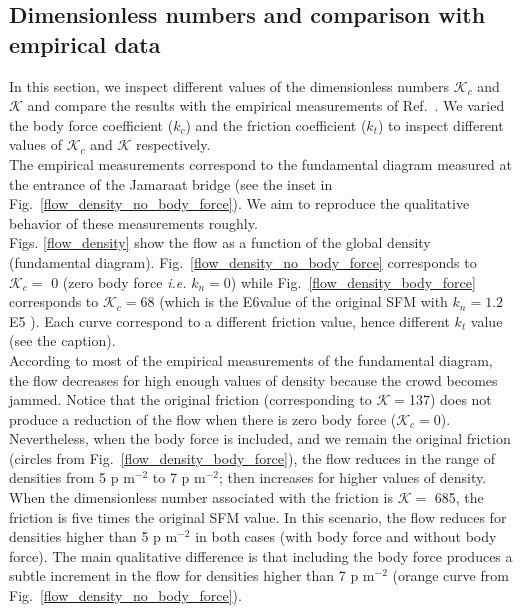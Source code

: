 \documentclass[preprint,12pt]{elsarticle}
\begin{document}
\subsection{Dimensionless numbers and comparison with empirical data}


In this section, we inspect different values of the dimensionless numbers $\mathcal{K}_c$ and $\mathcal{K}$ and compare the results with the empirical measurements of Ref.~\cite{helbing_2007}. We varied the body force coefficient ($k_c$) and the friction coefficient ($k_t$) to inspect different values of $\mathcal{K}_c$ and $\mathcal{K}$ respectively.\\

The empirical measurements correspond to the fundamental diagram measured at the entrance of the Jamaraat bridge (see the inset in Fig.~\ref{flow_density_no_body_force}). We aim to reproduce the qualitative behavior of these measurements roughly.\\

Figs. \ref{flow_density} show the flow as a function of the global density (fundamental diagram). Fig.~\ref{flow_density_no_body_force} corresponds to $\mathcal{K}_c=$ 0 (zero body force \textit{i.e.} $k_n=0$) while Fig.~\ref{flow_density_body_force} corresponds to $\mathcal{K}_c=$68 (which is the E6value of the original SFM with $k_n=1.2\,$E5 ). Each curve correspond to a different friction value, hence different $k_t$ value (see the caption).\\

According to most of the empirical measurements of the fundamental diagram, the flow decreases for high enough values of density because the crowd becomes jammed. Notice that the original friction (corresponding to $\mathcal{K}=$137) does not produce a reduction of the flow when there is zero body force ($\mathcal{K}_c=$0). Nevertheless, when the body force is included, and we remain the original friction (circles from Fig.~\ref{flow_density_body_force}), the flow reduces in the range of densities from  5 p m$^{-2}$ to 7 p m$^{-2}$; then increases for higher values of density.\\

When the dimensionless number associated with the friction is $\mathcal{K} = $ 685, the friction is five times the original SFM value. In this scenario, the flow reduces for densities higher than 5 p m$^{-2}$ in both cases (with body force and without body force). The main qualitative difference is that including the body force produces a subtle increment in the flow for densities higher than 7 p m$^{-2}$ (orange curve from Fig.~\ref{flow_density_no_body_force}). \\
\end{document}
